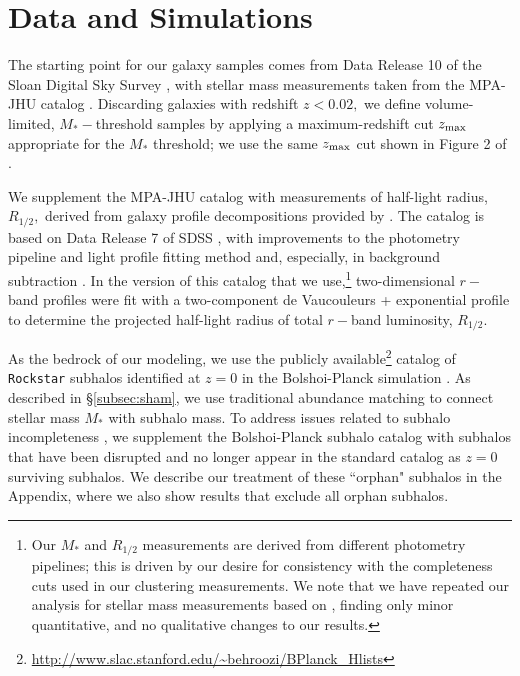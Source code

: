 \documentclass[usenatbib,usegraphicx,letterpaper]{mn2e}
\newcommand{\rhalf}{R_{1/2}}
\newcommand{\mstar}{M_{\ast}}
\begin{document}
\section{Data and Simulations}
\label{sec:data}

The starting point for our galaxy samples comes from Data Release 10 of the Sloan Digital Sky Survey \citep[SDSS,][]{ahn_etal14}, with stellar mass measurements taken from the MPA-JHU catalog \citep{kauffmann_etal03,brinchmann_etal04}. Discarding galaxies with redshift $z<0.02,$ we define volume-limited, $\mstar-$threshold samples by applying a maximum-redshift cut $z_{\rm max}$ appropriate for the $\mstar$ threshold; we use the same $z_{\rm max}$ cut shown in Figure 2 of \citet{behroozi_etal15}.

We supplement the MPA-JHU catalog with measurements of half-light radius, $\rhalf,$ derived from galaxy profile decompositions provided by \citet{meert_etal15}. The \citet{meert_etal15} catalog is based on Data Release 7 of SDSS \citep{abazajian_etal09}, with improvements to the photometry pipeline and light profile fitting method and, especially, in background subtraction \citep{vikram_etal10,bernardi_etal13,bernardi_etal14,meert_etal13}. In the version of this catalog that we use,\footnote{Our $\mstar$ and $\rhalf$ measurements are derived from different photometry pipelines; this is driven by our desire for consistency with the \citet{behroozi_etal15} completeness cuts used in our clustering measurements. We note that we have repeated our analysis for stellar mass measurements based on \citet{meert_etal15}, finding only minor quantitative, and no qualitative changes to our results.} two-dimensional $r-$band profiles were fit with a two-component de Vaucouleurs + exponential profile to determine the projected half-light radius of total $r-$band luminosity, $\rhalf.$

As the bedrock of our modeling, we use the publicly available\footnote{\url{http://www.slac.stanford.edu/~behroozi/BPlanck\_Hlists}} catalog of {\tt Rockstar} subhalos identified at $z=0$ in the Bolshoi-Planck simulation \citep{klypin_etal11,klypin_etal16,behroozi12_rockstar,riebe_etal13,behroozi_etal12b,rodriguez_puebla16_bolplanck}. As described in \S\ref{subsec:sham}, we use traditional abundance matching to connect stellar mass $\mstar$ with subhalo mass. To address issues related to subhalo incompleteness \citep{guo_white13,campbell_etal17}, we supplement the Bolshoi-Planck subhalo catalog with subhalos that have been disrupted and no longer appear in the standard catalog as $z=0$ surviving subhalos. We describe our treatment of these ``orphan" subhalos in the Appendix, where we also show results that exclude all orphan subhalos. 
\end{document}
